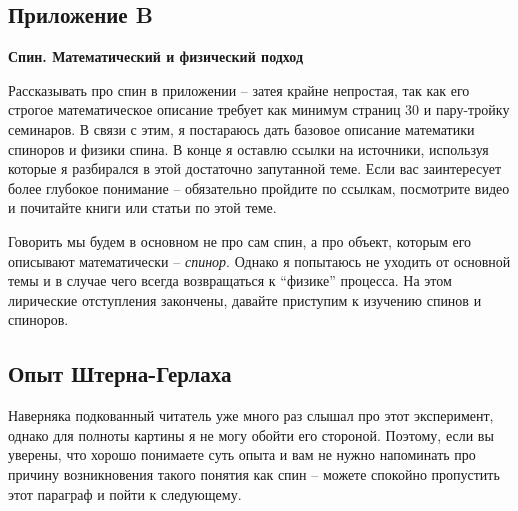 \setcounter{figure}{0}  
\begin{center}
    \section{Приложение B}\label{appendix:B}
    \textbf{\Large{Спин. Математический и физический подход}}
\end{center}

Рассказывать про спин в приложении -- затея крайне непростая, так как его строгое математическое описание требует как минимум страниц 30 и пару-тройку семинаров. В связи с этим, я постараюсь дать базовое описание математики спиноров и физики спина. В конце я оставлю ссылки на источники, используя которые я разбирался в этой достаточно запутанной теме. Если вас заинтересует более глубокое понимание -- обязательно пройдите по ссылкам, посмотрите видео и почитайте книги или статьи по этой теме. 

Говорить мы будем в основном не про сам спин, а про объект, которым его описывают математически -- \textit{спинор}. Однако я попытаюсь не уходить от основной темы и в случае чего всегда возвращаться к ``физике'' процесса. На этом лирические отступления закончены, давайте приступим к изучению спинов и спиноров.

\subsection{Опыт Штерна-Герлаха}
\hspace{1em} Наверняка подкованный читатель уже много раз слышал про этот эксперимент, однако для полноты картины я не могу обойти его стороной. Поэтому, если вы уверены, что хорошо понимаете суть опыта и вам не нужно напоминать про причину возникновения такого понятия как спин -- можете спокойно пропустить этот параграф и пойти к следующему.


